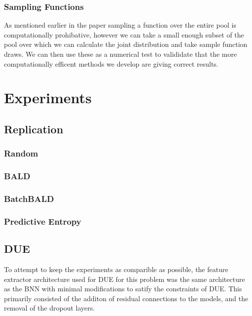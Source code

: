 \documentclass[12pt, a4paper]{report}
\theoremstyle{definition}
\begin{document}
\subsection{Sampling Functions}

As mentioned earlier in the paper sampling a function over the entire pool is computationally prohibative, however we can take a small enough subset of the pool over which we can calculate the joint distribution and take sample function draws.
We can then use these as a numerical test to valididate that the more computationally efficent methods we develop are giving correct results.


\chapter{Experiments}

\section{Replication}

\subsection{Random}

\subsection{BALD}

\subsection{BatchBALD}

\subsection{Predictive Entropy}

\section{DUE}

To attempt to keep the experiments as comparible as possible, the feature extractor architecture used for DUE for this problem was the same architecture as the BNN with minimal modifications to satify the constraints of DUE. This primarily consisted of the additon of residual connections to the models, and the removal of the dropout layers.
\end{document}
